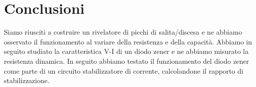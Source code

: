\section{Conclusioni}

Siamo riusciti a costruire un rivelatore di picchi di salita/discesa e ne abbiamo osservato il funzionamento al variare della resistenza e della capacità.
Abbiamo in seguito studiato la caratteristica V-I di un diodo zener e ne abbiamo misurato la resistenza dinamica. In seguito abbiamo testato il funzionamento del diodo zener come parte di un circuito stabilizzatore di corrente, calcolandone il rapporto di stabilizzazione.